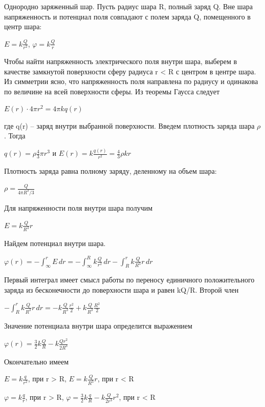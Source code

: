 \documentclass[12pt]{report}
\begin{document}
Однородно заряженный шар. Пусть радиус шара R, полный заряд Q. Вне шара напряженность и потенциал поля совпадают с полем заряда Q, помещенного в центр шара:
\begin{center}
    $ E = k \frac{Q}{r^2} $, $ \varphi = k \frac{Q}{r} $
\end{center}
Чтобы найти напряженность электрического поля внутри шара, выберем в качестве замкнутой поверхности сферу радиуса r < R с центром в центре шара. Из симметрии ясно, что напряженность поля направлена по радиусу и одинакова по величине на всей поверхности сферы. Из теоремы Гаусса следует
\begin{center}
    $E(r) \cdot 4 \pi r^2 = 4 \pi kq(r)$
\end{center}
где q(r) – заряд внутри выбранной поверхности. Введем плотность заряда шара $\rho$. Тогда
\begin{center}
    $q(r) = \rho \frac{4}{3} \pi r^3$ и $E(r) = k \frac{q(r)}{r^2} = \frac{4}{3} \rho k r$
\end{center}
Плотность заряда равна полному заряду, деленному на объем шара:
\begin{center}
    $\rho = \frac{Q}{4 \pi R^3/3}$
\end{center}
Для напряженности поля внутри шара получим
\begin{center}
    $E = k\frac{Q}{R^3}r$
\end{center}
Найдем потенциал внутри шара.
\begin{center}
    $\varphi(r) = -\int_{\infty}^{r}  E\,dr = -\int_{\infty}^{R} k \frac{Q}{r^2}\,dr - \int_{R}^{r} k \frac{Q}{R^3}r \,dr $
\end{center}
Первый интеграл имеет смысл работы по переносу единичного положительного заряда из бесконечности до поверхности шара и равен kQ/R. Второй член
\begin{center}
    $-\int_{R}^{r} k \frac{Q}{R^3}r \,dr = -k \frac{Q}{R^3} \frac{r^2}{2} + k \frac{Q}{R^3} \frac{R^2}{2} $
\end{center}
Значение потенциала внутри шара определится выражением
\begin{center}
    $\varphi(r) = \frac{3}{2} k \frac{Q}{R} - k \frac{Qr^2}{2R^3}$
\end{center}
Окончательно имеем
\begin{center}
    $E = k \frac{q}{r^2}$, при r > R, $E = k \frac{Q}{R^3}r$, при r < R
\end{center}
\begin{center}
    $\varphi = k \frac{q}{r}$, при r > R, $\varphi = \frac{3}{2} k \frac{q}{R} - k \frac{Q}{2r^3}r^2$, при r < R
\end{center}
\newpage
\end{document}
